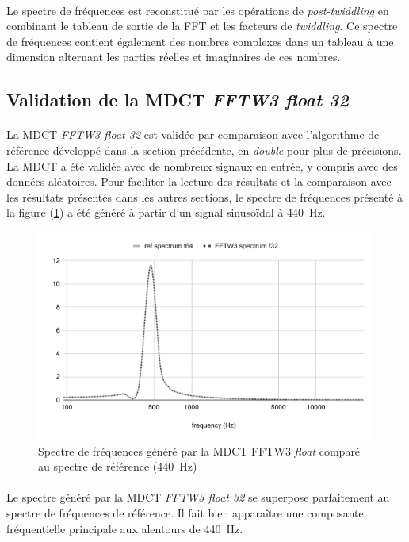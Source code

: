 \documentclass{article}
\begin{document}
    \paragraph{}
    Le spectre de fréquences est reconstitué par les opérations de \emph{post-twiddling} en combinant le tableau de sortie de la FFT et les facteurs de \emph{twiddling}. Ce spectre de fréquences contient également des nombres complexes dans un tableau à une dimension alternant les parties réelles et imaginaires de ces nombres.


    \subsection{Validation de la MDCT \emph{FFTW3 float 32}}
    \paragraph{}
    La MDCT \emph{FFTW3 float 32} est validée par comparaison avec l'algorithme de référence développé dans la section précédente, en \emph{double} pour plus de précisions. La MDCT a été validée avec de nombreux signaux en entrée, y compris avec des données aléatoires. Pour faciliter la lecture des résultats et la comparaison avec les résultats présentés dans les autres sections, le spectre de fréquences présenté à la figure (\ref{fig:validation_fftw3_f32}) a été généré à partir d'un signal sinusoïdal à \SI{440}{\hertz}.

    \begin{figure}[H]
        \centering
        \includegraphics[width=.8\linewidth]{./images/validation_fftw_f32.pdf}
        \caption{Spectre de fréquences généré par la MDCT FFTW3 \emph{float} comparé au spectre de référence (\SI{440}{\hertz})}
        \label{fig:validation_fftw3_f32}
    \end{figure}

    \paragraph{}
    Le spectre généré par la MDCT \emph{FFTW3 float 32} se superpose parfaitement au spectre de fréquences de référence. Il fait bien apparaître une composante fréquentielle principale aux alentours de \SI{440}{\hertz}.
\end{document}
